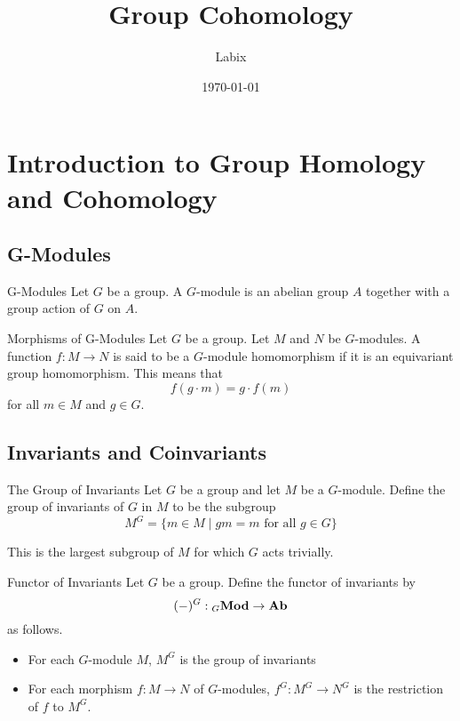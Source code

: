 \documentclass[a4paper]{article}
\title{Group Cohomology}
\author{Labix}
\date{\today}
\begin{document}
\maketitle
\begin{abstract}
\end{abstract}
\pagebreak
\tableofcontents

\pagebreak
\section{Introduction to Group Homology and Cohomology}
\subsection{G-Modules}
\begin{defn}{G-Modules}{} Let $G$ be a group. A $G$-module is an abelian group $A$ together with a group action of $G$ on $A$. 
\end{defn}

\begin{defn}{Morphisms of G-Modules}{} Let $G$ be a group. Let $M$ and $N$ be $G$-modules. A function $f:M\to N$ is said to be a $G$-module homomorphism if it is an equivariant group homomorphism. This means that $$f(g\cdot m)=g\cdot f(m)$$ for all $m\in M$ and $g\in G$. 
\end{defn}

\subsection{Invariants and Coinvariants}
\begin{defn}{The Group of Invariants}{} Let $G$ be a group and let $M$ be a $G$-module. Define the group of invariants of $G$ in $M$ to be the subgroup $$M^G=\{m\in M\;|\;gm=m\text{ for all }g\in G\}$$
\end{defn}

This is the largest subgroup of $M$ for which $G$ acts trivially. 

\begin{defn}{Functor of Invariants}{} Let $G$ be a group. Define the functor of invariants by $$(-)^G:{_G}\bold{Mod}\to\bold{Ab}$$ as follows. 
\begin{itemize}
\item For each $G$-module $M$, $M^G$ is the group of invariants
\item For each morphism $f:M\to N$ of $G$-modules, $f^G:M^G\to N^G$ is the restriction of $f$ to $M^G$. 
\end{itemize}
\end{defn}
\end{document}
